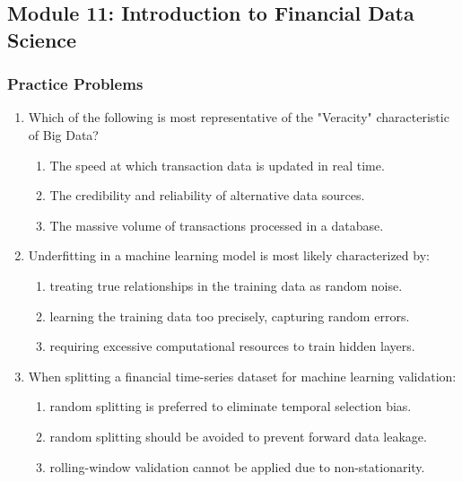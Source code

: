 \newpage

\subsection{Module 11: Introduction to Financial Data Science}
\label{sec:app_Problems_M11}

\subsubsection{Practice Problems}
\label{subsec:app_Problems_M11}

\begin{enumerate}
	\item Which of the following is most representative of the "Veracity" characteristic of Big Data?
	      \begin{enumerate}[label=\Alph*.]
		      \item The speed at which transaction data is updated in real time.
		      \item The credibility and reliability of alternative data sources.
		      \item The massive volume of transactions processed in a database.
	      \end{enumerate}
	
	\item Underfitting in a machine learning model is most likely characterized by:
	      \begin{enumerate}[label=\Alph*.]
		      \item treating true relationships in the training data as random noise.
		      \item learning the training data too precisely, capturing random errors.
		      \item requiring excessive computational resources to train hidden layers.
	      \end{enumerate}

	\item When splitting a financial time-series dataset for machine learning validation:
	      \begin{enumerate}[label=\Alph*.]
		      \item random splitting is preferred to eliminate temporal selection bias.
		      \item random splitting should be avoided to prevent forward data leakage.
		      \item rolling-window validation cannot be applied due to non-stationarity.
	      \end{enumerate}


\end{enumerate}
